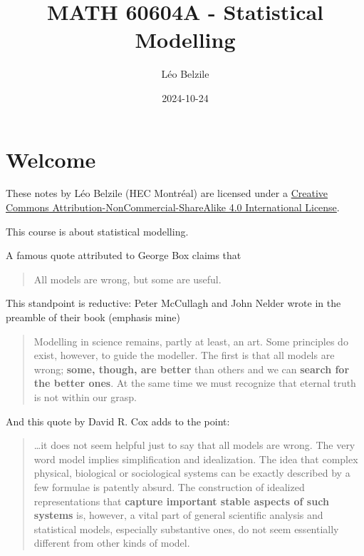 \documentclass[
  11pt,
  letterpaper,
]{scrbook}
\title{MATH 60604A - Statistical Modelling}
\author{Léo Belzile}
\date{2024-10-24}
\renewcommand*\contentsname{Table of contents}
\newcommand\contentsname{Table of contents}
\theoremstyle{definition}
\theoremstyle{plain}
\theoremstyle{definition}
\theoremstyle{plain}
\theoremstyle{remark}
\begin{document}


\renewcommand*\contentsname{Table of contents}
{
\setcounter{tocdepth}{2}
\tableofcontents
}

\mainmatter
{}

\chapter*{Welcome}\label{welcome}


These notes by Léo Belzile (HEC Montréal) are licensed under a
\href{http://creativecommons.org/licenses/by-nc-sa/4.0/}{Creative
Commons Attribution-NonCommercial-ShareAlike 4.0 International License}.

This course is about statistical modelling.

A famous quote attributed to George Box claims that

\begin{quote}
All models are wrong, but some are useful.
\end{quote}

This standpoint is reductive: Peter McCullagh and John Nelder wrote in
the preamble of their book (emphasis mine)

\begin{quote}
Modelling in science remains, partly at least, an art. Some principles
do exist, however, to guide the modeller. The first is that all models
are wrong; \textbf{some, though, are better} than others and we can
\textbf{search for the better ones}. At the same time we must recognize
that eternal truth is not within our grasp.
\end{quote}

And this quote by David R. Cox adds to the point:

\begin{quote}
\ldots it does not seem helpful just to say that all models are wrong.
The very word model implies simplification and idealization. The idea
that complex physical, biological or sociological systems can be exactly
described by a few formulae is patently absurd. The construction of
idealized representations that \textbf{capture important stable aspects
of such systems} is, however, a vital part of general scientific
analysis and statistical models, especially substantive ones, do not
seem essentially different from other kinds of model.
\end{quote}
\end{document}
